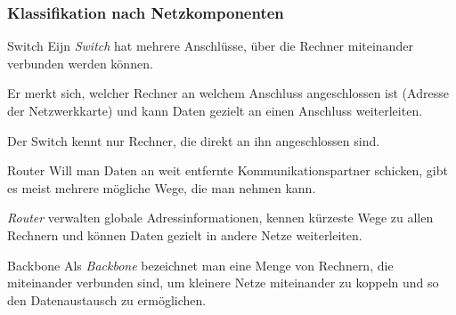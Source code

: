 \subsubsection{Klassifikation nach Netzkomponenten}

\begin{defi}{Switch}
    Eijn \emph{Switch} hat mehrere Anschlüsse, über die Rechner miteinander verbunden werden können.

    Er merkt sich, welcher Rechner an welchem Anschluss angeschlossen ist (Adresse der Netzwerkkarte) und kann Daten gezielt an einen Anschluss weiterleiten.

    Der Switch kennt nur Rechner, die direkt an ihn angeschlossen sind.
\end{defi}

\begin{defi}{Router}
    Will man Daten an weit entfernte Kommunikationspartner schicken, gibt es meist mehrere mögliche Wege, die man nehmen kann.

    \emph{Router} verwalten globale Adressinformationen, kennen kürzeste Wege zu allen Rechnern und können Daten gezielt in andere Netze weiterleiten.
\end{defi}

\begin{defi}{Backbone}
    Als \emph{Backbone} bezeichnet man eine Menge von Rechnern, die miteinander verbunden sind, um kleinere Netze miteinander zu koppeln und so den Datenaustausch zu ermöglichen.
\end{defi}
